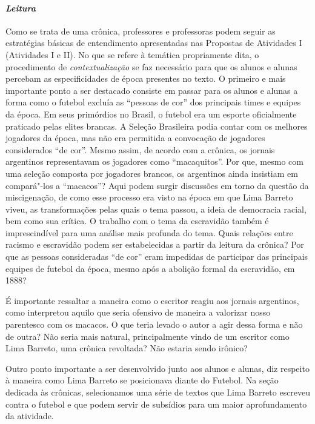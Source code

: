 \documentclass[11pt]{extarticle}
\begin{document}
\paragraph{\textit{Leitura}}
Como se trata de uma crônica, professores e professoras podem seguir
as estratégias básicas de entendimento apresentadas nas Propostas de
Atividades I (Atividades I e II). No que se refere à temática propriamente
dita, o procedimento de \emph{contextualização} se faz necessário para
que os alunos e alunas percebam as especificidades de época presentes no
texto. O primeiro e mais importante ponto a ser destacado consiste em
passar para os alunos e alunas a forma como o futebol excluía as
``pessoas de cor'' dos principais times e equipes da época. Em seus
primórdios no Brasil, o futebol era um esporte oficialmente praticado
pelas elites brancas. A Seleção Brasileira podia contar com os melhores
jogadores da época, mas não era permitida a convocação de jogadores
considerados ``de cor''. Mesmo assim, de acordo com a crônica, os
jornais argentinos representavam os jogadores como ``macaquitos''. Por
que, mesmo com uma seleção composta por jogadores brancos, os argentinos
ainda insistiam em compará"-los a ``macacos''? Aqui podem surgir
discussões em torno da questão da miscigenação, de como esse processo
era visto na época em que Lima Barreto viveu, as transformações pelas
quais o tema passou, a ideia de democracia racial, bem como sua crítica.
O trabalho com o tema da escravidão também é imprescindível para uma
análise mais profunda do tema. Quais relações entre racismo e escravidão
podem ser estabelecidas a partir da leitura da crônica? Por que as
pessoas consideradas ``de cor'' eram impedidas de participar das
principais equipes de futebol da época, mesmo após a abolição formal da
escravidão, em 1888?


É importante ressaltar a maneira como o escritor reagiu aos jornais
argentinos, como interpretou aquilo que seria ofensivo de maneira a valorizar
nosso parentesco com os macacos. O que teria levado o autor a agir dessa
forma e não de outra? Não seria mais natural, principalmente vindo de um
escritor como Lima Barreto, uma crônica revoltada? Não estaria sendo
irônico?

Outro ponto importante a ser desenvolvido junto aos alunos e alunas,
diz respeito à maneira como Lima Barreto se posicionava diante do
Futebol. Na seção dedicada às crônicas, selecionamos uma série de textos
que Lima Barreto escreveu contra o futebol e que podem servir de
subsídios para um maior aprofundamento da atividade.
\end{document}
